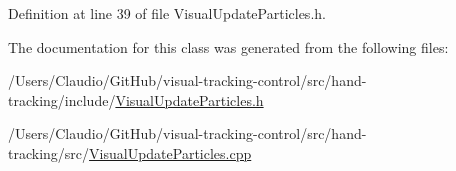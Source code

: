 Definition at line 39 of file Visual\+Update\+Particles.\+h.



The documentation for this class was generated from the following files\+:\begin{DoxyCompactItemize}
\item 
/\+Users/\+Claudio/\+Git\+Hub/visual-\/tracking-\/control/src/hand-\/tracking/include/\hyperlink{VisualUpdateParticles_8h}{Visual\+Update\+Particles.\+h}\item 
/\+Users/\+Claudio/\+Git\+Hub/visual-\/tracking-\/control/src/hand-\/tracking/src/\hyperlink{VisualUpdateParticles_8cpp}{Visual\+Update\+Particles.\+cpp}\end{DoxyCompactItemize}

